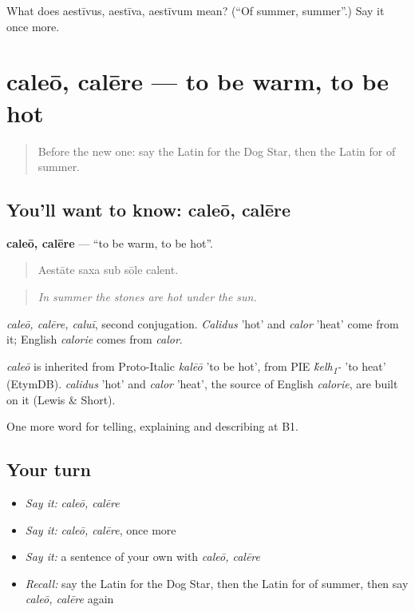 \begin{tcolorbox}[breakable,colback=teal!4,colframe=teal!35!black,title={Before you move on}]
What does aestīvus, aestīva, aestīvum mean? (\textquotedblleft{}Of summer, summer\textquotedblright{}.) Say it once more.
\end{tcolorbox}
\section[caleō, calēre]{caleō, calēre — to be warm, to be hot}

\label{lesson:LA-C488-caleo}



\begin{quote}
Before the new one: say the Latin for the Dog Star, then the Latin for of summer.
\end{quote}

\subsection*{You'll want to know: caleō, calēre}
\textbf{caleō, calēre} — \textquotedblleft{}to be warm, to be hot\textquotedblright{}.

\begin{quote}
Aestāte saxa sub sōle calent.
\end{quote}

\begin{quote}
\emph{In summer the stones are hot under the sun.}
\end{quote}

\emph{caleō, calēre, caluī}, second conjugation. \emph{Calidus} 'hot' and \emph{calor} 'heat' come from it; English \emph{calorie} comes from \emph{calor}.

\begin{cousinweb}
\emph{caleō} is inherited from Proto-Italic \emph{kalēō} 'to be hot', from PIE \emph{\'{k}elh\textsubscript{1}-} 'to heat' (EtymDB). \emph{calidus} 'hot' and \emph{calor} 'heat', the source of English \emph{calorie}, are built on it (Lewis \& Short).
\end{cousinweb}

\begin{grammarlens}[title={What you've built}]
One more word for telling, explaining and describing at B1.
\end{grammarlens}

\subsection*{Your turn}
\begin{itemize}
\raggedright
  \item \emph{Say it:} \emph{caleō, calēre}
  \item \emph{Say it:} \emph{caleō, calēre}, once more
  \item \emph{Say it:} a sentence of your own with \emph{caleō, calēre}
  \item \emph{Recall:} say the Latin for the Dog Star, then the Latin for of summer, then say \emph{caleō, calēre} again
\end{itemize}

